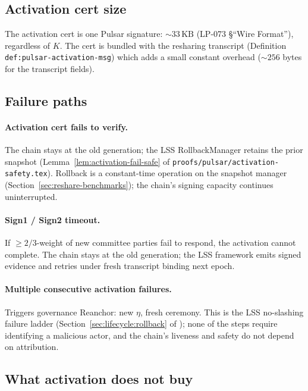 \subsection{Activation cert size}

The activation cert is one Pulsar signature: $\sim 33\,\mathrm{KB}$ (LP-073 \cite{lp073} \S``Wire Format''), regardless of $K$. The cert is bundled with the resharing transcript (Definition \texttt{def:pulsar-activation-msg}) which adds a small constant overhead ($\sim 256$ bytes for the transcript fields).

\subsection{Failure paths}

\paragraph{Activation cert fails to verify.} The chain stays at the old generation; the LSS RollbackManager retains the prior snapshot (Lemma~\ref{lem:activation-fail-safe} of \texttt{proofs/pulsar/activation-safety.tex}). Rollback is a constant-time operation on the snapshot manager (Section~\ref{sec:reshare-benchmarks}); the chain's signing capacity continues uninterrupted.

\paragraph{Sign1 / Sign2 timeout.} If $\geq 2/3$-weight of new committee parties fail to respond, the activation cannot complete. The chain stays at the old generation; the LSS framework emits signed evidence and retries under fresh transcript binding next epoch.

\paragraph{Multiple consecutive activation failures.} Triggers governance Reanchor: new $\eta$, fresh ceremony. This is the LSS no-slashing failure ladder (Section~\ref{sec:lifecycle:rollback} of \cite{luxpulsar}); none of the steps require identifying a malicious actor, and the chain's liveness and safety do not depend on attribution.

\subsection{What activation does not buy}

